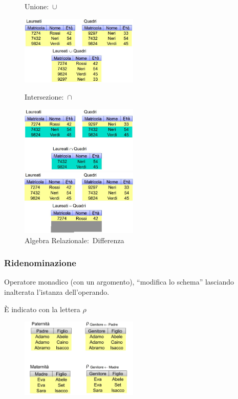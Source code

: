 \begin{figure}[H]
	\centering
	\caption*{Unione:\ $\cup$}
	\includegraphics[width=0.5\textwidth]{immagini/AR_unione.jpg}

	\caption*{Intersezione:\ $\cap$}
	\includegraphics[width=0.5\textwidth]{immagini/AR_intersezione.jpg}

	\caption*{Algebra Relazionale:\ Differenza}
	\includegraphics[width=0.5\textwidth]{immagini/AR_differenza.jpg}
\end{figure}

\subsubsection{Ridenominazione}

Operatore monadico (con un argomento), ``modifica lo schema'' lasciando inalterata l'istanza dell'operando.

È indicato con la lettera $\rho$

\begin{figure}[H]
	\centering
	\includegraphics[width=0.5\textwidth]{immagini/AR_ridenominazione.jpg}
\end{figure}

